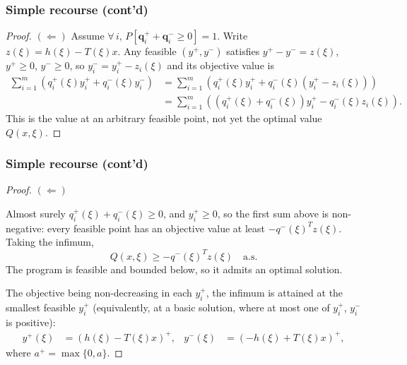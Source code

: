 \documentclass[aspectratio=169]{beamer}
\begin{document}
\begin{frame}
\frametitle{Simple recourse (cont'd)}
\small
	
\begin{proof}

{\bf $(\Leftarrow)$}
Assume $\forall\, i$, $P[\boldsymbol{q}_i^+ + \boldsymbol{q}_i^- \geq 0] = 1$.
Write $z(\xi) = h(\xi)-T(\xi)x$. Any feasible $(y^+, y^-)$ satisfies $y^+-y^- = z(\xi)$, $y^+ \geq 0$, $y^- \geq 0$, so $y_i^- = y_i^+ - z_i(\xi)$ and its {\red objective value} is
\begin{align*}
\sum_{i=1}^{m} \left( q_i^+(\xi)y_i^+ + q_i^-(\xi)y_i^- \right)
&= \sum_{i=1}^{m} \left( q_i^+(\xi)y_i^+ + q_i^-(\xi)\left(y_i^+-z_i(\xi)\right) \right) \\
&= \sum_{i=1}^{m} \left( \left(q_i^+(\xi) + q_i^-(\xi)\right)y_i^+ - q_i^-(\xi)z_i(\xi) \right).
\end{align*}
This is the value at an arbitrary feasible point, not yet the optimal value $Q(x,\xi)$.

\end{proof}

\end{frame}

\begin{frame}
\frametitle{Simple recourse (cont'd)}
\small

\begin{proof}
{\bf $(\Leftarrow)$}

Almost surely $q_i^+(\xi) + q_i^-(\xi) \geq 0$, and $y_i^+ \geq 0$, so the first sum above is non-negative: {\red every} feasible point has an objective value at least $-q^-(\xi)^Tz(\xi)$. Taking the infimum,
$$
Q(x,\xi) \geq -q^-(\xi)^Tz(\xi) \quad \text{a.s.}
$$
The program is feasible and bounded below, so it admits an optimal solution.

\mbox{}

The objective being non-decreasing in each $y_i^+$, the infimum is attained at the smallest feasible $y_i^+$ (equivalently, at a basic solution, where at most one of $y_i^+$, $y_i^-$ is positive):
\begin{align*}
	y^+(\xi) &= \left(h(\xi)-T(\xi)x\right)^+, &
	y^-(\xi) &= \left(-h(\xi)+T(\xi)x\right)^+,
\end{align*}
where $a^+ = \max\{0, a\}$.

\end{proof}

\end{frame}
\end{document}
